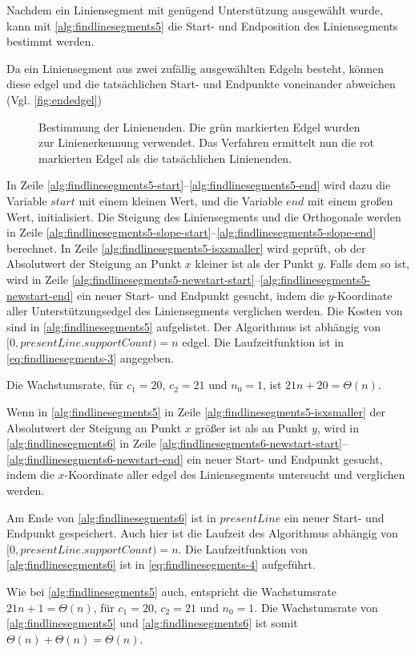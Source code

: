 Nachdem ein Liniensegment mit genügend Unterstützung ausgewählt wurde, kann mit \autoref{alg:findlinesegments5} die
 Start- und Endposition des Liniensegments bestimmt werden.

Da ein Liniensegment aus zwei zufällig ausgewählten Edgeln besteht, können diese \gls{edgel} und die
 tatsächlichen Start- und Endpunkte voneinander abweichen (Vgl. \autoref{fig:endedgel})
\begin{figure}[!ht]
	\centering
	
	\caption{Bestimmung der Linienenden. Die grün markierten Edgel wurden zur Linienerkennung verwendet.
	 Das Verfahren ermittelt nun die rot markierten Edgel als die tatsächlichen Linienenden.}
	\label{fig:endedgel}
\end{figure}
In Zeile
 \ref{alg:findlinesegments5-start}--\ref{alg:findlinesegments5-end} wird dazu die Variable $\mathit{start}$ mit einem
 kleinen Wert, und die Variable $\mathit{end}$ mit einem großen Wert, initialisiert. Die Steigung des Liniensegments
 und die Orthogonale werden in Zeile \ref{alg:findlinesegments5-slope-start}--\ref{alg:findlinesegments5-slope-end}
 berechnet. In Zeile \ref{alg:findlinesegments5-isxsmaller} wird geprüft, ob der Absolutwert der Steigung an Punkt $x$
 kleiner ist als der Punkt $y$. Falls dem so ist, wird in Zeile
 \ref{alg:findlinesegments5-newstart-start}--\ref{alg:findlinesegments5-newstart-end} ein neuer Start- und Endpunkt
 gesucht, indem die $y$-Koordinate aller Unterstützungsedgel des Liniensegments verglichen werden. Die Kosten von
  sind in \autoref{alg:findlinesegments5} aufgelistet. Der Algorithmus ist abhängig von
 $[0,\mathit{presentLine.supportCount}) = n$ \gls{edgel}. Die Laufzeitfunktion ist in \autoref{eq:findlinesegments-3}
 angegeben.

Die Wachstumsrate, für $c_{1} = 20$, $c_{2} = 21$ und $n_{0} = 1$, ist $21n + 20 = \Theta(n)$.

Wenn in \autoref{alg:findlinesegments5} in Zeile \ref{alg:findlinesegments5-isxsmaller} der Absolutwert der Steigung an
 Punkt $x$ größer ist als an Punkt $y$, wird in \autoref{alg:findlinesegments6} in Zeile
 \ref{alg:findlinesegments6-newstart-start}--\ref{alg:findlinesegments6-newstart-end} ein neuer Start- und Endpunkt
 gesucht, indem die $x$-Koordinate aller \gls{edgel} des Liniensegments untersucht und verglichen werden.

Am Ende von \autoref{alg:findlinesegments6} ist in $\mathit{presentLine}$ ein neuer Start- und Endpunkt gespeichert.
 Auch hier ist die Laufzeit des Algorithmus abhängig von $[0,\mathit{presentLine.supportCount}) = n$. Die
 Laufzeitfunktion von \autoref{alg:findlinesegments6} ist in \autoref{eq:findlinesegments-4} aufgeführt.

Wie bei \autoref{alg:findlinesegments5} auch, entspricht die Wachstumsrate $21n + 1 = \Theta(n)$, für
 $c_{1} = 20$, $c_{2} = 21$ und $n_{0} = 1$. Die Wachstumsrate von \autoref{alg:findlinesegments5} und
 \autoref{alg:findlinesegments6} ist somit $\Theta(n) + \Theta(n) = \Theta(n)$.

